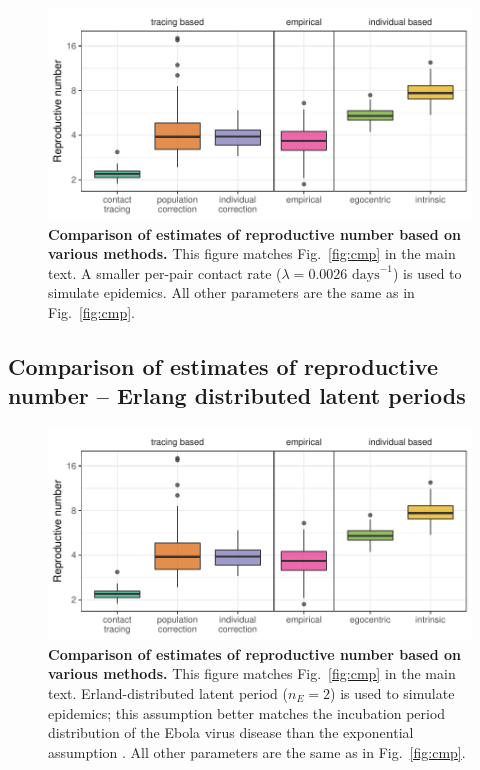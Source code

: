 \documentclass[12pt]{article}
\newcommand{\fref}[1]{Fig.~\ref{fig:#1}}
\begin{document}
\begin{figure}[!pbth]
\includegraphics[width=\textwidth]{../fig/cmp_reproductive.pdf}
\caption{\textbf{Comparison of estimates of reproductive number based on various methods.}
This figure matches \fref{cmp} in the main text.
A smaller per-pair contact rate ($\lambda = 0.0026 \textrm{ days}^{-1}$) is used to simulate epidemics.
All other parameters are the same as in \fref{cmp}.
}
\label{fig:cmpsmall}
\end{figure}

\subsection{Comparison of estimates of reproductive number -- Erlang distributed latent periods}

\begin{figure}[!pbth]
\includegraphics[width=\textwidth]{../fig/cmp_reproductive.pdf}
\caption{\textbf{Comparison of estimates of reproductive number based on various methods.}
This figure matches \fref{cmp} in the main text.
Erland-distributed latent period ($n_E=2$) is used to simulate epidemics; this assumption better matches the incubation period distribution of the Ebola virus disease than the exponential assumption \citep{who2014ebola}.
All other parameters are the same as in \fref{cmp}.
}
\label{fig:cmpseminir}
\end{figure}

\pagebreak


\end{document}
